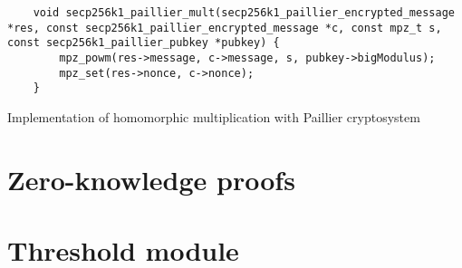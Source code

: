 \begin{listing}
  \begin{verbatim}
    void secp256k1_paillier_mult(secp256k1_paillier_encrypted_message *res, const secp256k1_paillier_encrypted_message *c, const mpz_t s, const secp256k1_paillier_pubkey *pubkey) {
        mpz_powm(res->message, c->message, s, pubkey->bigModulus);
        mpz_set(res->nonce, c->nonce);
    }
  \end{verbatim}
	\caption{Implementation of homomorphic multiplication with Paillier cryptosystem}
	\label{lst:implDecryptPaillier}
\end{listing}

\section{Zero-knowledge proofs}
\lipsum[1-2]

\section{Threshold module}
\lipsum[1-2]
